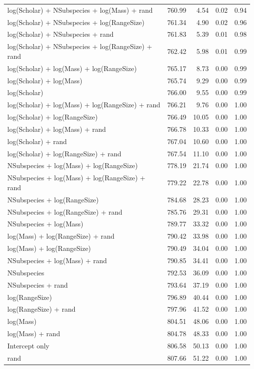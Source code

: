 \begin{table}[ht]
\begin{tabular}{@{}lrrrr@{}}
  log(Scholar) + NSubspecies + log(Mass) + rand & 760.99 & 4.54 & 0.02 & 0.94 \\ 
  log(Scholar) + NSubspecies + log(RangeSize) & 761.34 & 4.90 & 0.02 & 0.96 \\ 
  log(Scholar) + NSubspecies + rand & 761.83 & 5.39 & 0.01 & 0.98 \\ 
  log(Scholar) + NSubspecies + log(RangeSize) + rand & 762.42 & 5.98 & 0.01 & 0.99 \\ 
  log(Scholar) + log(Mass) + log(RangeSize) & 765.17 & 8.73 & 0.00 & 0.99 \\ 
  log(Scholar) + log(Mass) & 765.74 & 9.29 & 0.00 & 0.99 \\ 
  log(Scholar) & 766.00 & 9.55 & 0.00 & 0.99 \\ 
  log(Scholar) + log(Mass) + log(RangeSize) + rand & 766.21 & 9.76 & 0.00 & 1.00 \\ 
  log(Scholar) + log(RangeSize) & 766.49 & 10.05 & 0.00 & 1.00 \\ 
  log(Scholar) + log(Mass) + rand & 766.78 & 10.33 & 0.00 & 1.00 \\ 
  log(Scholar) + rand & 767.04 & 10.60 & 0.00 & 1.00 \\ 
  log(Scholar) + log(RangeSize) + rand & 767.54 & 11.10 & 0.00 & 1.00 \\ 
  NSubspecies + log(Mass) + log(RangeSize) & 778.19 & 21.74 & 0.00 & 1.00 \\ 
  NSubspecies + log(Mass) + log(RangeSize) + rand & 779.22 & 22.78 & 0.00 & 1.00 \\ 
  NSubspecies + log(RangeSize) & 784.68 & 28.23 & 0.00 & 1.00 \\ 
  NSubspecies + log(RangeSize) + rand & 785.76 & 29.31 & 0.00 & 1.00 \\ 
  NSubspecies + log(Mass) & 789.77 & 33.32 & 0.00 & 1.00 \\ 
  log(Mass) + log(RangeSize) + rand & 790.42 & 33.98 & 0.00 & 1.00 \\ 
  log(Mass) + log(RangeSize) & 790.49 & 34.04 & 0.00 & 1.00 \\ 
  NSubspecies + log(Mass) + rand & 790.85 & 34.41 & 0.00 & 1.00 \\ 
  NSubspecies & 792.53 & 36.09 & 0.00 & 1.00 \\ 
  NSubspecies + rand & 793.64 & 37.19 & 0.00 & 1.00 \\ 
  log(RangeSize) & 796.89 & 40.44 & 0.00 & 1.00 \\ 
  log(RangeSize) + rand & 797.96 & 41.52 & 0.00 & 1.00 \\ 
  log(Mass) & 804.51 & 48.06 & 0.00 & 1.00 \\ 
  log(Mass) + rand & 804.78 & 48.33 & 0.00 & 1.00 \\ 
  Intercept only & 806.58 & 50.13 & 0.00 & 1.00 \\ 
  rand & 807.66 & 51.22 & 0.00 & 1.00 \\ 
   \bottomrule
\end{tabular}
\endgroup
\end{table}




